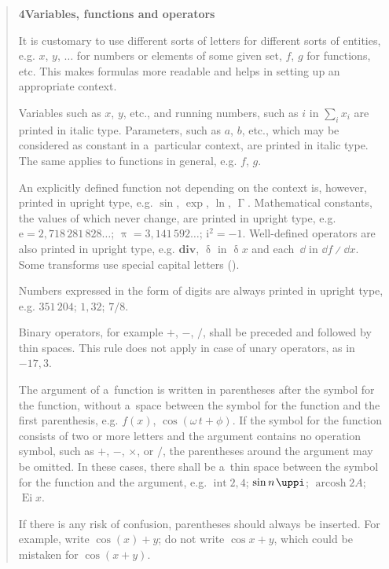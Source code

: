 \begin{quotation}
	\sloppy%
	\textbf{4\quad Variables, functions and operators}\par{}\baselineskip
	\noindent It is customary to use different sorts of letters for different sorts of entities, e.g. $x$, $y$, $\dots$ for numbers or elements of some given set, $f$, $g$ for functions, etc. This makes formulas more readable and helps in setting up an appropriate context. \par
	Variables such as $x$, $y$, etc., and running numbers, such as $i$ in $\sum_i x_i$ are printed in italic type. Parameters, such as $a$, $b$, etc., which may be considered as constant in a~particular context, are printed in italic type. The same applies to functions in general, e.g. $f$, $g$. \par
	An explicitly defined function not depending on the context is, however, printed in upright type, e.g. $\sin$, $\exp$, $\ln$, $\upGamma$. Mathematical constants, the values of which never change, are printed in upright type, e.g. ${\mathrm{e} = 2{,}718\,281\,828\dots}$; ${\uppi = 3{,}141\,592\dots}$; ${\mathrm{i}^2 = -1}$. Well-defined operators are also printed in upright type, e.g. $\mathbf{div}$, $\updelta$ in $\updelta x$ and each~$\dd$ in ${\dd f \divslash \dd x}$. Some transforms use special capital letters (\textellipsis\!). \par
	Numbers expressed in the form of digits are always printed in upright type, e.g. $351\,204$; $1{,}32$; $7/8$. \par
	Binary operators, for example $+$, $-$, $/$, shall be preceded and followed by thin spaces. This rule does not apply in case of unary operators, as in $-17{,}3$. \par
	The argument of a~function is written in parentheses after the symbol for the function, without a~space between the symbol for the function and the first parenthesis, e.g. $f(x)$, ${\cos(\omega\,t + \phi)}$. If the symbol for the function consists of two or more letters and the argument contains no operation symbol, such as $+$, $-$, $\times$, or $/$, the parentheses around the argument may be omitted. In these cases, there shall be a~thin space between the symbol for the function and the argument, e.g. $\operatorname{int} 2{,}4$; $\sin n{\kern 0.1em}\uppi$; $\operatorname{arcosh} 2A$; $\operatorname{Ei} x$. \par
	If there is any risk of confusion, parentheses should always be inserted. For example, write $\cos(x) + y$; do not write $\cos x + y$, which could be mistaken for $\cos(x + y)$. \par

\end{quotation}
